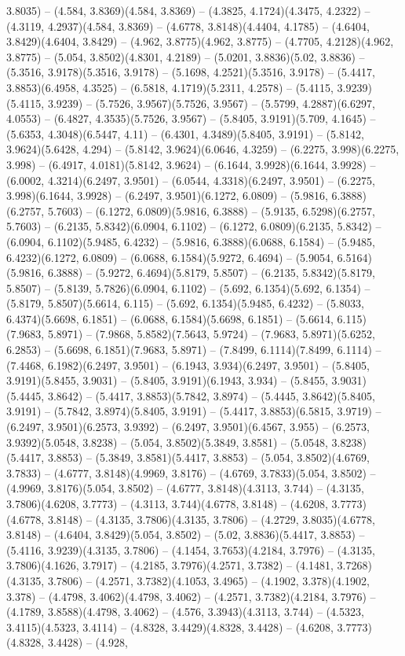 3.8035) -- (4.584, 3.8369)(4.584, 3.8369) -- (4.3825, 4.1724)(4.3475, 4.2322) -- (4.3119, 4.2937)(4.584, 3.8369) -- (4.6778, 3.8148)(4.4404, 4.1785) -- (4.6404, 3.8429)(4.6404, 3.8429) -- (4.962, 3.8775)(4.962, 3.8775) -- (4.7705, 4.2128)(4.962, 3.8775) -- (5.054, 3.8502)(4.8301, 4.2189) -- (5.0201, 3.8836)(5.02, 3.8836) -- (5.3516, 3.9178)(5.3516, 3.9178) -- (5.1698, 4.2521)(5.3516, 3.9178) -- (5.4417, 3.8853)(6.4958, 4.3525) -- (6.5818, 4.1719)(5.2311, 4.2578) -- (5.4115, 3.9239)(5.4115, 3.9239) -- (5.7526, 3.9567)(5.7526, 3.9567) -- (5.5799, 4.2887)(6.6297, 4.0553) -- (6.4827, 4.3535)(5.7526, 3.9567) -- (5.8405, 3.9191)(5.709, 4.1645) -- (5.6353, 4.3048)(6.5447, 4.11) -- (6.4301, 4.3489)(5.8405, 3.9191) -- (5.8142, 3.9624)(5.6428, 4.294) -- (5.8142, 3.9624)(6.0646, 4.3259) -- (6.2275, 3.998)(6.2275, 3.998) -- (6.4917, 4.0181)(5.8142, 3.9624) -- (6.1644, 3.9928)(6.1644, 3.9928) -- (6.0002, 4.3214)(6.2497, 3.9501) -- (6.0544, 4.3318)(6.2497, 3.9501) -- (6.2275, 3.998)(6.1644, 3.9928) -- (6.2497, 3.9501)(6.1272, 6.0809) -- (5.9816, 6.3888)(6.2757, 5.7603) -- (6.1272, 6.0809)(5.9816, 6.3888) -- (5.9135, 6.5298)(6.2757, 5.7603) -- (6.2135, 5.8342)(6.0904, 6.1102) -- (6.1272, 6.0809)(6.2135, 5.8342) -- (6.0904, 6.1102)(5.9485, 6.4232) -- (5.9816, 6.3888)(6.0688, 6.1584) -- (5.9485, 6.4232)(6.1272, 6.0809) -- (6.0688, 6.1584)(5.9272, 6.4694) -- (5.9054, 6.5164)(5.9816, 6.3888) -- (5.9272, 6.4694)(5.8179, 5.8507) -- (6.2135, 5.8342)(5.8179, 5.8507) -- (5.8139, 5.7826)(6.0904, 6.1102) -- (5.692, 6.1354)(5.692, 6.1354) -- (5.8179, 5.8507)(5.6614, 6.115) -- (5.692, 6.1354)(5.9485, 6.4232) -- (5.8033, 6.4374)(5.6698, 6.1851) -- (6.0688, 6.1584)(5.6698, 6.1851) -- (5.6614, 6.115)(7.9683, 5.8971) -- (7.9868, 5.8582)(7.5643, 5.9724) -- (7.9683, 5.8971)(5.6252, 6.2853) -- (5.6698, 6.1851)(7.9683, 5.8971) -- (7.8499, 6.1114)(7.8499, 6.1114) -- (7.4468, 6.1982)(6.2497, 3.9501) -- (6.1943, 3.934)(6.2497, 3.9501) -- (5.8405, 3.9191)(5.8455, 3.9031) -- (5.8405, 3.9191)(6.1943, 3.934) -- (5.8455, 3.9031)(5.4445, 3.8642) -- (5.4417, 3.8853)(5.7842, 3.8974) -- (5.4445, 3.8642)(5.8405, 3.9191) -- (5.7842, 3.8974)(5.8405, 3.9191) -- (5.4417, 3.8853)(6.5815, 3.9719) -- (6.2497, 3.9501)(6.2573, 3.9392) -- (6.2497, 3.9501)(6.4567, 3.955) -- (6.2573, 3.9392)(5.0548, 3.8238) -- (5.054, 3.8502)(5.3849, 3.8581) -- (5.0548, 3.8238)(5.4417, 3.8853) -- (5.3849, 3.8581)(5.4417, 3.8853) -- (5.054, 3.8502)(4.6769, 3.7833) -- (4.6777, 3.8148)(4.9969, 3.8176) -- (4.6769, 3.7833)(5.054, 3.8502) -- (4.9969, 3.8176)(5.054, 3.8502) -- (4.6777, 3.8148)(4.3113, 3.744) -- (4.3135, 3.7806)(4.6208, 3.7773) -- (4.3113, 3.744)(4.6778, 3.8148) -- (4.6208, 3.7773)(4.6778, 3.8148) -- (4.3135, 3.7806)(4.3135, 3.7806) -- (4.2729, 3.8035)(4.6778, 3.8148) -- (4.6404, 3.8429)(5.054, 3.8502) -- (5.02, 3.8836)(5.4417, 3.8853) -- (5.4116, 3.9239)(4.3135, 3.7806) -- (4.1454, 3.7653)(4.2184, 3.7976) -- (4.3135, 3.7806)(4.1626, 3.7917) -- (4.2185, 3.7976)(4.2571, 3.7382) -- (4.1481, 3.7268)(4.3135, 3.7806) -- (4.2571, 3.7382)(4.1053, 3.4965) -- (4.1902, 3.378)(4.1902, 3.378) -- (4.4798, 3.4062)(4.4798, 3.4062) -- (4.2571, 3.7382)(4.2184, 3.7976) -- (4.1789, 3.8588)(4.4798, 3.4062) -- (4.576, 3.3943)(4.3113, 3.744) -- (4.5323, 3.4115)(4.5323, 3.4114) -- (4.8328, 3.4429)(4.8328, 3.4428) -- (4.6208, 3.7773)(4.8328, 3.4428) -- (4.928, 